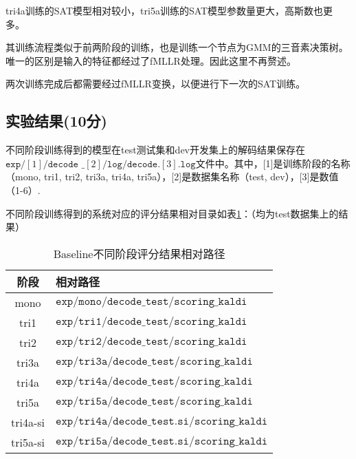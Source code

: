 \documentclass[a4paper]{article}
\renewcommand{\tt}[1]{\mathtt{#1}}
\begin{document}
tri4a训练的SAT模型相对较小，tri5a训练的SAT模型参数量更大，高斯数也更多。

其训练流程类似于前两阶段的训练，也是训练一个节点为GMM的三音素决策树。唯一的区别是输入的特征都经过了fMLLR处理。因此这里不再赘述。

两次训练完成后都需要经过fMLLR变换，以便进行下一次的SAT训练。


\subsection{实验结果(10分)}

不同阶段训练得到的模型在test测试集和dev开发集上的解码结果保存在$\tt{exp/}[1]\tt{/decode}$ $\_[2]\tt{/log/decode.}[3]\tt{.log}$文件中。其中，[1]是训练阶段的名称（mono, tri1, tri2, tri3a, tri4a, tri5a），[2]是数据集名称（test, dev），[3]是数值（1-6）.

不同阶段训练得到的系统对应的评分结果相对目录如表\ref{tab1}：（均为test数据集上的结果）

\begin{table}[th]
  \begin{tabular}{ c l }
    \toprule
    \textbf{阶段} & \textbf{相对路径}  \\
    \midrule
    mono & $\tt{exp/mono/decode\_test/scoring\_kaldi}$  \\
    tri1 & $\tt{exp/tri1/decode\_test/scoring\_kaldi}$  \\
    tri2 & $\tt{exp/tri2/decode\_test/scoring\_kaldi}$  \\
    tri3a & $\tt{exp/tri3a/decode\_test/scoring\_kaldi}$  \\
    tri4a & $\tt{exp/tri4a/decode\_test/scoring\_kaldi}$  \\
    tri5a & $\tt{exp/tri5a/decode\_test/scoring\_kaldi}$  \\
    \midrule
    tri4a-si & $\tt{exp/tri4a/decode\_test.si/scoring\_kaldi}$  \\
    tri5a-si & $\tt{exp/tri5a/decode\_test.si/scoring\_kaldi}$  \\
    \bottomrule
  \end{tabular}
  \vspace{0.5em}
  \centering \caption{Baseline不同阶段评分结果相对路径}
  \label{tab1}
\end{table}
\end{document}
